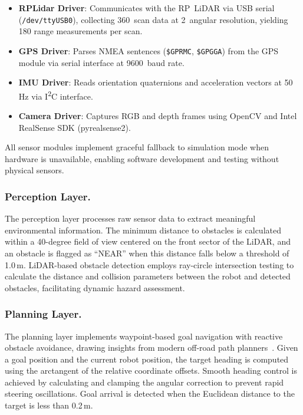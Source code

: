\documentclass[runningheads]{llncs}
\begin{document}
\begin{itemize}\setlength{\itemsep}{0.2ex}\parskip0pt
    \item \textbf{RPLidar Driver}: Communicates with the RP~LiDAR via USB serial (\texttt{/dev/ttyUSB0}), collecting 360\textdegree\ scan data at 2\textdegree\ angular resolution, yielding 180 range measurements per scan.
    \item \textbf{GPS Driver}: Parses NMEA sentences (\texttt{\$GPRMC}, \texttt{\$GPGGA}) from the GPS module via serial interface at 9600~baud rate.
    \item \textbf{IMU Driver}: Reads orientation quaternions and acceleration vectors at 50\,Hz via I\textsuperscript{2}C interface.
    \item \textbf{Camera Driver}: Captures RGB and depth frames using OpenCV and Intel RealSense SDK (pyrealsense2).
\end{itemize}

All sensor modules implement graceful fallback to simulation mode when hardware is unavailable, enabling software development and testing without physical sensors.

\subsubsection{Perception Layer.}

The perception layer processes raw sensor data to extract meaningful environmental information. The minimum distance to obstacles is calculated within a 40-degree field of view centered on the front sector of the LiDAR, and an obstacle is flagged as ``NEAR'' when this distance falls below a threshold of 1.0\,m. LiDAR-based obstacle detection employs ray-circle intersection testing to calculate the distance and collision parameters between the robot and detected obstacles, facilitating dynamic hazard assessment.

\subsubsection{Planning Layer.}

The planning layer implements waypoint-based goal navigation with reactive obstacle avoidance, drawing insights from modern off-road path planners~\cite{jiang2024risk, mukherjee2025terrain}. Given a goal position and the current robot position, the target heading is computed using the arctangent of the relative coordinate offsets. Smooth heading control is achieved by calculating and clamping the angular correction to prevent rapid steering oscillations. Goal arrival is detected when the Euclidean distance to the target is less than 0.2\,m.
\end{document}
